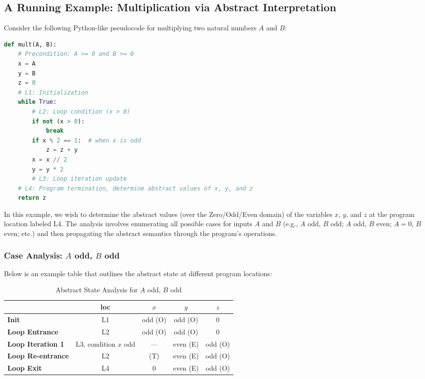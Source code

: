 \documentclass[oneside,11pt,dvipsnames]{book}
\begin{document}
\subsection{A Running Example: Multiplication via Abstract Interpretation}

Consider the following Python-like pseudocode for multiplying two natural numbers \(A\) and \(B\):

\begin{lstlisting}[language=Python, caption=Multiplication via Repeated Addition]
def mult(A, B):
    # Precondition: A >= 0 and B >= 0
    x = A
    y = B
    z = 0
    # L1: Initialization
    while True:
        # L2: Loop condition (x > 0)
        if not (x > 0):
            break
        if x % 2 == 1:  # when x is odd
            z = z + y
        x = x // 2
        y = y * 2
        # L3: Loop iteration update
    # L4: Program termination, determine abstract values of x, y, and z
    return z
\end{lstlisting}

In this example, we wish to determine the abstract values (over the Zero/Odd/Even domain) of the variables \(x\), \(y\), and \(z\) at the program location labeled L4. The analysis involves enumerating all possible cases for inputs \(A\) and \(B\) (e.g., \(A\) odd, \(B\) odd; \(A\) odd, \(B\) even; \(A=0\), \(B\) even; etc.) and then propagating the abstract semantics through the program’s operations.

\subsubsection{Case Analysis: \(A\) odd, \(B\) odd}

Below is an example table that outlines the abstract state at different program locations:

\begin{table}[h]
\centering
\begin{tabular}{|l|c|c|c|c|}
\hline
 & \textbf{loc} & \textbf{\(x\)} & \textbf{\(y\)} & \textbf{\(z\)} \\ \hline
\textbf{Init} & L1 & odd (O) & odd (O) & 0 \\ \hline
\textbf{Loop Entrance} & L2 & odd (O) & odd (O) & 0 \\ \hline
\textbf{Loop Iteration 1} & L3, condition \(x\) odd & --- & even (E) & odd (O) \\ \hline
\textbf{Loop Re-entrance} & L2 & (T) & even (E) & odd (O) \\ \hline
\textbf{Loop Exit} & L4 & 0 & even (E) & odd (O) \\ \hline
\end{tabular}
\caption{Abstract State Analysis for \(A\) odd, \(B\) odd}
\end{table}
\end{document}
